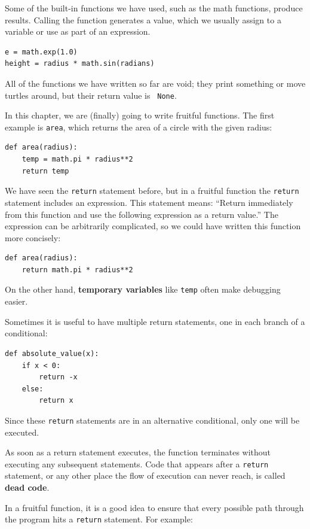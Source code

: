 \documentclass[10pt]{book}
\begin{document}
\begin{CJK}{UTF8}{gbsn}
Some of the built-in functions we have used, such as the math
functions, produce results.  Calling the function generates a
value, which we usually assign to a variable or use as part of an
expression.

\begin{verbatim}
e = math.exp(1.0)
height = radius * math.sin(radians)
\end{verbatim}
%
All of the functions we have written so far are void; they print
something or move turtles around, but their return value is {\tt
None}.

In this chapter, we are (finally) going to write fruitful functions.
The first example is {\tt area}, which returns the area of a circle
with the given radius:

\begin{verbatim}
def area(radius):
    temp = math.pi * radius**2
    return temp
\end{verbatim}
%
We have seen the {\tt return} statement before, but in a fruitful
function the {\tt return} statement includes
an expression.  This statement means: ``Return immediately from
this function and use the following expression as a return value.''
The expression can be arbitrarily complicated, so we could
have written this function more concisely:

\begin{verbatim}
def area(radius):
    return math.pi * radius**2
\end{verbatim}
%
On the other hand, {\bf temporary variables} like {\tt temp} often make
debugging easier.

Sometimes it is useful to have multiple return statements, one in each
branch of a conditional:

\begin{verbatim}
def absolute_value(x):
    if x < 0:
        return -x
    else:
        return x
\end{verbatim}
%
Since these {\tt return} statements are in an alternative conditional,
only one will be executed.

As soon as a return statement executes, the function
terminates without executing any subsequent statements.
Code that appears after a {\tt return} statement, or any other place
the flow of execution can never reach, is called {\bf dead code}.

In a fruitful function, it is a good idea to ensure
that every possible path through the program hits a
{\tt return} statement.  For example:


\end{CJK}
\end{document}
